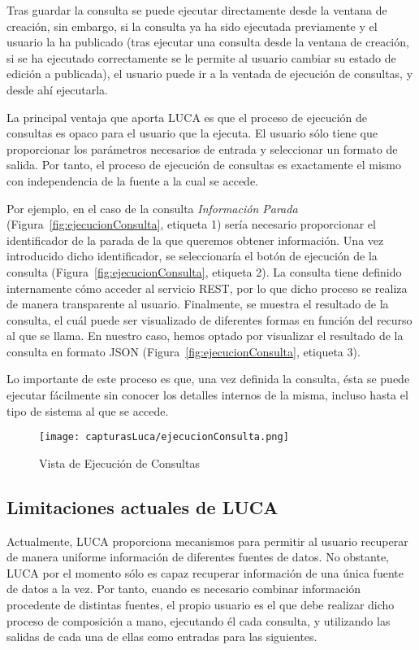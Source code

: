 Tras guardar la consulta se puede ejecutar directamente desde la ventana de creación, sin embargo, si la consulta ya ha sido ejecutada previamente y el usuario la ha publicado (tras ejecutar una consulta desde la ventana de creación, si se ha ejecutado correctamente se le permite al usuario cambiar su estado de edición a publicada), el usuario puede ir a la ventada de ejecución de consultas, y desde ahí ejecutarla.

La principal ventaja que aporta LUCA es que el proceso de ejecución de consultas es opaco para el usuario que la ejecuta. El usuario sólo tiene que proporcionar los parámetros necesarios de entrada y seleccionar un formato de salida. Por tanto, el proceso de ejecución de consultas es exactamente el mismo con independencia de la fuente a la cual se accede.

Por ejemplo, en el caso de la consulta \emph{Información Parada} (Figura~\ref{fig:ejecucionConsulta}, etiqueta 1) sería necesario proporcionar el identificador de la parada de la que queremos obtener información. Una vez introducido dicho identificador, se seleccionaría el botón de ejecución de la consulta (Figura~\ref{fig:ejecucionConsulta}, etiqueta 2). La consulta tiene definido internamente cómo acceder al servicio REST, por lo que dicho proceso se realiza de manera transparente al usuario. Finalmente, se muestra el resultado de la consulta, el cuál puede ser visualizado de diferentes formas en función del recurso al que se llama. En nuestro caso, hemos optado por visualizar el resultado de la consulta en formato JSON (Figura~\ref{fig:ejecucionConsulta}, etiqueta 3).

Lo importante de este proceso es que, una vez definida la consulta, ésta se puede ejecutar fácilmente sin conocer los detalles internos de la misma, incluso hasta el tipo de sistema al que se accede.


	\begin{figure}[!tb]
		\centering
		\texttt{[image: capturasLuca/ejecucionConsulta.png]}
		\caption{Vista de Ejecución de Consultas}\label{fig:ejecucionConsultas}
	\end{figure}

\subsection{Limitaciones actuales de LUCA}

Actualmente, LUCA proporciona mecanismos para permitir al usuario recuperar de manera uniforme información de diferentes fuentes de datos. No obstante, LUCA por el momento sólo es capaz recuperar información de una única fuente de datos a la vez. Por tanto, cuando es necesario combinar información procedente de distintas fuentes, el propio usuario es el que debe realizar dicho proceso de composición a mano, ejecutando él cada consulta, y utilizando las salidas de cada una de ellas como entradas para las siguientes.


